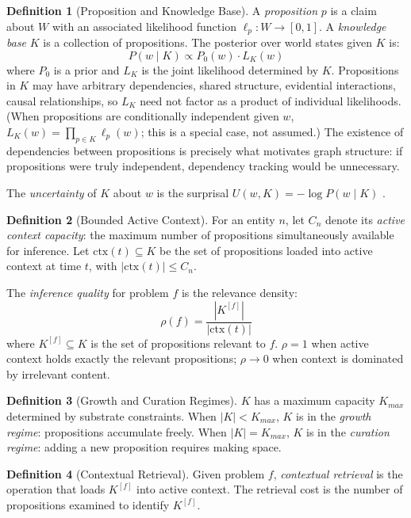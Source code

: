 \documentclass[11pt]{article}
\theoremstyle{definition}
\newtheorem{definition}{Definition}
\begin{document}
\begin{definition}[Proposition and Knowledge Base]
\label{def:knowledge}
A \emph{proposition} $p$ is a claim about $W$ with an associated
likelihood function $\ell_p : W \to [0,1]$. A \emph{knowledge base} $K$
is a collection of propositions. The posterior over world states given
$K$ is:
\[
P(w \mid K) \propto P_0(w) \cdot L_K(w)
\]
where $P_0$ is a prior and $L_K$ is the joint likelihood determined by
$K$. Propositions in $K$ may have arbitrary dependencies, shared
structure, evidential interactions, causal relationships, so $L_K$ need
not factor as a product of individual likelihoods. (When propositions
are conditionally independent given $w$, $L_K(w) = \prod_{p \in K}
\ell_p(w)$; this is a special case, not assumed.) The existence of
dependencies between propositions is precisely what motivates graph
structure: if propositions were truly independent, dependency tracking
would be unnecessary.

The \emph{uncertainty} of $K$ about $w$ is the
surprisal $U(w, K) = -\log P(w \mid K)$ \cite{Shannon1948, Cover2006}.
\end{definition}

\begin{definition}[Bounded Active Context]
\label{def:context}
For an entity $n$, let $C_n$ denote its \emph{active context capacity}:
the maximum number of propositions simultaneously available for
inference. Let
$\mathrm{ctx}(t) \subseteq K$ be the set of propositions loaded into
active context at time $t$, with $|\mathrm{ctx}(t)| \leq C_n$.

The \emph{inference quality} for problem $f$ is the relevance density:
\[
\rho(f) = \frac{|K^{[f]}|}{|\mathrm{ctx}(t)|}
\]
where $K^{[f]} \subseteq K$ is the set of propositions relevant to $f$.
$\rho = 1$ when active context holds exactly the relevant propositions;
$\rho \to 0$ when context is dominated by irrelevant content.
\end{definition}

\begin{definition}[Growth and Curation Regimes]
\label{def:regimes}
$K$ has a maximum capacity $K_{max}$ determined by substrate constraints.
When $|K| < K_{max}$, $K$ is in the \emph{growth regime}: propositions
accumulate freely. When $|K| = K_{max}$, $K$ is in the \emph{curation
regime}: adding a new proposition requires making space.
\end{definition}

\begin{definition}[Contextual Retrieval]
\label{def:retrieval}
Given problem $f$, \emph{contextual retrieval} is the operation that
loads $K^{[f]}$ into active context. The retrieval cost is the number of
propositions examined to identify $K^{[f]}$.
\end{definition}
\end{document}
